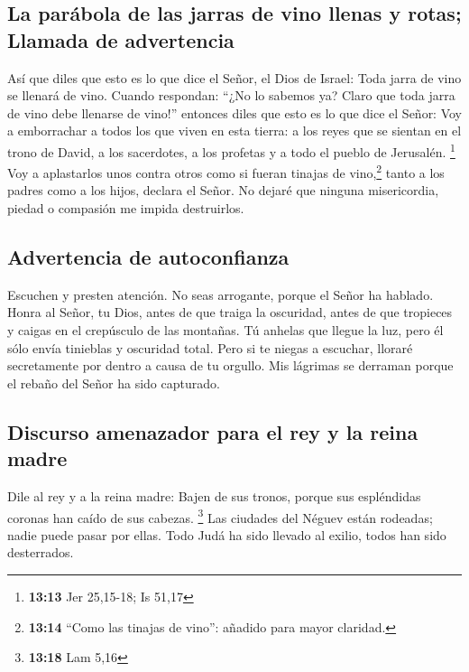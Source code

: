 \hypertarget{la-paruxe1bola-de-las-jarras-de-vino-llenas-y-rotas-llamada-de-advertencia}{%
\subsection{La parábola de las jarras de vino llenas y rotas; Llamada de
advertencia}\label{la-paruxe1bola-de-las-jarras-de-vino-llenas-y-rotas-llamada-de-advertencia}}

 Así que diles que esto es lo que dice el Señor, el Dios
de Israel: Toda jarra de vino se llenará de vino. Cuando respondan:
``¿No lo sabemos ya? Claro que toda jarra de vino debe llenarse de
vino!''  entonces diles que esto es lo que dice el Señor:
Voy a emborrachar a todos los que viven en esta tierra: a los reyes que
se sientan en el trono de David, a los sacerdotes, a los profetas y a
todo el pueblo de Jerusalén. \footnote{\textbf{13:13} Jer 25,15-18; Is
  51,17}  Voy a aplastarlos unos contra otros como si
fueran tinajas de vino,\footnote{\textbf{13:14} ``Como las tinajas de
  vino'': añadido para mayor claridad.} tanto a los padres como a los
hijos, declara el Señor. No dejaré que ninguna misericordia, piedad o
compasión me impida destruirlos.

\hypertarget{advertencia-de-autoconfianza}{%
\subsection{Advertencia de
autoconfianza}\label{advertencia-de-autoconfianza}}

 Escuchen y presten atención. No seas arrogante, porque
el Señor ha hablado.  Honra al Señor, tu Dios, antes de
que traiga la oscuridad, antes de que tropieces y caigas en el
crepúsculo de las montañas. Tú anhelas que llegue la luz, pero él sólo
envía tinieblas y oscuridad total.  Pero si te niegas a
escuchar, lloraré secretamente por dentro a causa de tu orgullo. Mis
lágrimas se derraman porque el rebaño del Señor ha sido capturado.

\hypertarget{discurso-amenazador-para-el-rey-y-la-reina-madre}{%
\subsection{Discurso amenazador para el rey y la reina
madre}\label{discurso-amenazador-para-el-rey-y-la-reina-madre}}

 Dile al rey y a la reina madre: Bajen de sus tronos,
porque sus espléndidas coronas han caído de sus cabezas. \footnote{\textbf{13:18}
  Lam 5,16}  Las ciudades del Néguev están rodeadas;
nadie puede pasar por ellas. Todo Judá ha sido llevado al exilio, todos
han sido desterrados.

